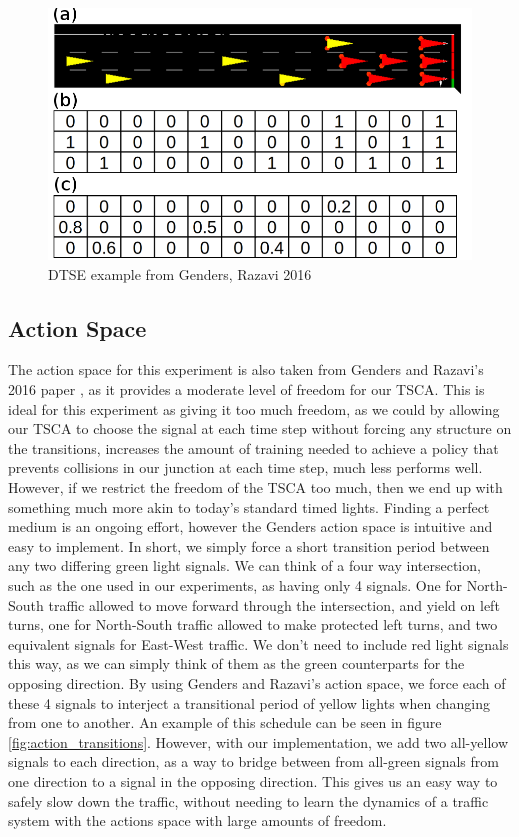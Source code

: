 \documentclass[12pt,twocolumn]{article}
\begin{document}
\begin{figure}
    \includegraphics[height=0.2\textheight]{Figures/dtse_example}
    \caption{DTSE example from Genders, Razavi 2016}
    \label{fig:DTSE_Genders}
\end{figure}

\subsection{Action Space}
The action space for this experiment is also taken from Genders and Razavi's 2016 paper \cite{Genders}, as it provides a moderate level of freedom for our TSCA. This is ideal for this experiment as giving it too much freedom, as we could by allowing our TSCA to choose the signal at each time step without forcing any structure on the transitions, increases the amount of training needed to achieve a policy that prevents collisions in our junction at each time step, much less performs well. However, if we restrict the freedom of the TSCA too much, then we end up with something much more akin to today's standard timed lights. Finding a perfect medium is an ongoing effort, however the Genders action space is intuitive and easy to implement. In short, we simply force a short transition period between any two differing green light signals. We can think of a four way intersection, such as the one used in our experiments, as having only 4 signals. One for North-South traffic allowed to move forward through the intersection, and yield on left turns, one for North-South traffic allowed to make protected left turns, and two equivalent signals for East-West traffic. We don't need to include red light signals this way, as we can simply think of them as the green counterparts for the opposing direction. By using Genders and Razavi's action space, we force each of these 4 signals to interject a transitional period of yellow lights when changing from one to another. An example of this schedule can be seen in figure \ref{fig:action_transitions}. However, with our implementation, we add two all-yellow signals to each direction, as a way to bridge between from all-green signals from one direction to a signal in the opposing direction. This gives us an easy way to safely slow down the traffic, without needing to learn the dynamics of a traffic system with the actions space with large amounts of freedom.
\end{document}

